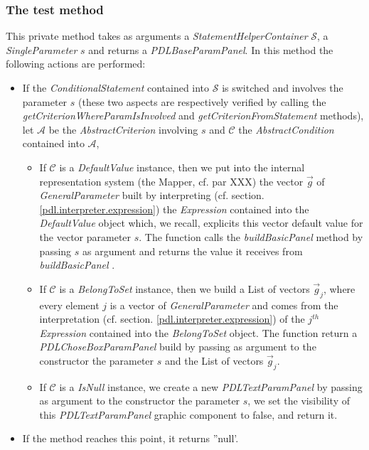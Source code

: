 \documentclass[a4paper,11pt] {ivoa}
\begin{document}
\subsubsection{The test method}
This private method takes as arguments a {\it StatementHelperContainer} $\mathcal S$, a {\it SingleParameter} $s$ and returns a  {\it PDLBaseParamPanel}. In this method the following actions are performed:
\begin{itemize}
\item If the {\it ConditionalStatement} contained into $\mathcal S$ is switched and involves the parameter $s$ (these two aspects are respectively verified by calling the {\it getCriterionWhereParamIsInvolved}  and {\it getCriterionFromStatement} methods), let $\mathcal A$ be the {\it AbstractCriterion} involving $s$ and $\mathcal C$ the {\it AbstractCondition} contained into $\mathcal A$,
\begin{itemize}
\item If $\mathcal C$ is a {\it DefaultValue} instance, then we put into the internal representation system (the Mapper, cf. par XXX) the vector $\vec g$ of {\it GeneralParameter} built by interpreting (cf. section. \ref{pdl.interpreter.expression}) the {\it Expression} contained into the {\it DefaultValue} object which, we recall, explicits this vector default value for the vector parameter $s$. The function calls the {\it buildBasicPanel} method by passing $s$ as argument and returns the value it receives from {\it buildBasicPanel} .
\item If $\mathcal C$ is a {\it BelongToSet} instance, then we build a List of vectors $\vec g_j$, where every element $j$ is a vector of {\it GeneralParameter} and comes from the interpretation (cf. section. \ref{pdl.interpreter.expression}) of the  $j^{th}$ {\it Expression} contained into the {\it BelongToSet} object. The function return a {\it PDLChoseBoxParamPanel} build by passing as argument to the constructor the parameter $s$ and the List of vectors $\vec g_j$.
\item If  $\mathcal C$ is a {\it IsNull} instance, we create a new {\it PDLTextParamPanel} by passing as argument to the constructor the parameter $s$, we set the visibility of this  {\it PDLTextParamPanel} graphic component to false, and return it.
\end{itemize}
\item If the method reaches this point, it returns ''null'.
\end{itemize}
\end{document}
